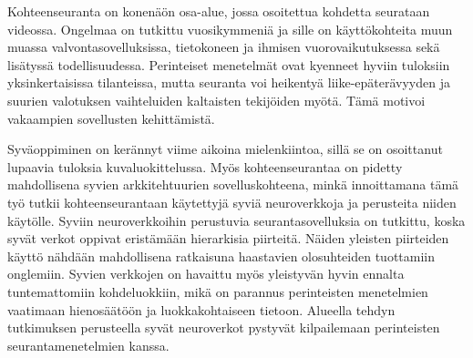 \begin{abstractpage}[finnish]
Kohteenseuranta on konenäön osa-alue, jossa osoitettua kohdetta seurataan videossa. Ongelmaa on tutkittu vuosikymmeniä ja sille on käyttökohteita muun muassa valvontasovelluksissa, tietokoneen ja ihmisen vuorovaikutuksessa sekä lisätyssä todellisuudessa. Perinteiset menetelmät ovat kyenneet hyviin tuloksiin yksinkertaisissa tilanteissa, mutta seuranta voi heikentyä liike-epäterävyyden ja suurien valotuksen vaihteluiden kaltaisten tekijöiden myötä. Tämä motivoi vakaampien sovellusten kehittämistä.

Syväoppiminen on kerännyt viime aikoina mielenkiintoa, sillä se on osoittanut lupaavia tuloksia kuvaluokittelussa. Myös kohteenseurantaa on pidetty mahdollisena syvien arkkitehtuurien sovelluskohteena, minkä innoittamana tämä työ tutkii kohteenseurantaan käytettyjä syviä neuroverkkoja ja perusteita niiden käytölle. Syviin neuroverkkoihin perustuvia seurantasovelluksia on tutkittu, koska syvät verkot oppivat eristämään hierarkisia piirteitä. Näiden yleisten piirteiden käyttö nähdään mahdollisena ratkaisuna haastavien olosuhteiden tuottamiin onglemiin. Syvien verkkojen on havaittu myös yleistyvän hyvin ennalta tuntemattomiin kohdeluokkiin, mikä on parannus perinteisten menetelmien vaatimaan hienosäätöön ja luokkakohtaiseen tietoon. Alueella tehdyn tutkimuksen perusteella syvät neuroverkot pystyvät kilpailemaan perinteisten seurantamenetelmien kanssa.
\end{abstractpage}

